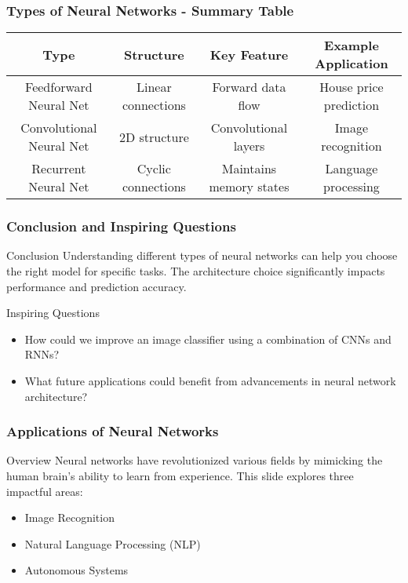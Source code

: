 \documentclass[aspectratio=169]{beamer}
\begin{document}
\begin{frame}[fragile]
    \frametitle{Types of Neural Networks - Summary Table}
    \begin{table}[ht]
        \centering
        \begin{tabular}{|c|c|c|c|}
            \hline
            \textbf{Type} & \textbf{Structure} & \textbf{Key Feature} & \textbf{Example Application} \\
            \hline
            Feedforward Neural Net & Linear connections & Forward data flow & House price prediction \\
            \hline
            Convolutional Neural Net & 2D structure & Convolutional layers & Image recognition \\
            \hline
            Recurrent Neural Net & Cyclic connections & Maintains memory states & Language processing \\
            \hline
        \end{tabular}
    \end{table}
\end{frame}

\begin{frame}[fragile]
    \frametitle{Conclusion and Inspiring Questions}
    \begin{block}{Conclusion}
        Understanding different types of neural networks can help you choose the right model for specific tasks. The architecture choice significantly impacts performance and prediction accuracy.
    \end{block}

    \begin{block}{Inspiring Questions}
        \begin{itemize}
            \item How could we improve an image classifier using a combination of CNNs and RNNs?
            \item What future applications could benefit from advancements in neural network architecture?
        \end{itemize}
    \end{block}
\end{frame}

\begin{frame}[fragile]
    \frametitle{Applications of Neural Networks}
    \begin{block}{Overview}
        Neural networks have revolutionized various fields by mimicking the human brain's ability to learn from experience. This slide explores three impactful areas:
        \begin{itemize}
            \item Image Recognition
            \item Natural Language Processing (NLP)
            \item Autonomous Systems
        \end{itemize}
    \end{block}
\end{frame}
\end{document}
